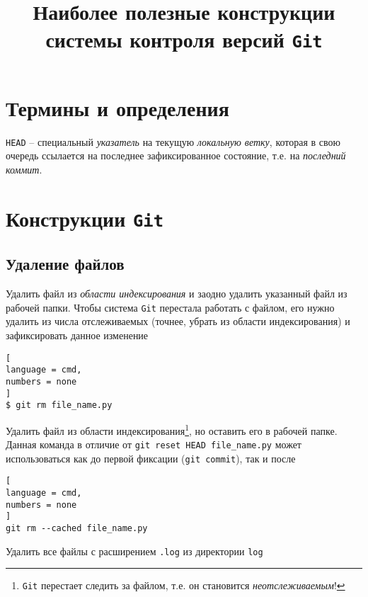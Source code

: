 \documentclass[%
	11pt,
	a4paper,
	utf8,
		]{article}
\begin{document}
\title{Наиболее полезные конструкции\\системы контроля версий  \texttt{Git}}

\author{}

\date{}
\maketitle

\thispagestyle{fancy}

\tableofcontents

\section{Термины и определения}

\noindent\texttt{HEAD} -- специальный \textit{указатель} на текущую \emph{локальную ветку}, которая в свою очередь ссылается на последнее зафиксированное состояние, т.е. на \emph{последний коммит}.


\section{Конструкции \texttt{Git}}

\subsection{Удаление файлов}

Удалить файл из \emph{области индексирования} и заодно удалить указанный файл из рабочей папки. Чтобы система \texttt{Git} перестала работать с файлом, его нужно удалить из числа отслеживаемых (точнее, убрать из области индексирования) и зафиксировать данное изменение 

\begin{lstlisting}[
language = cmd,
numbers = none
]
$ git rm file_name.py
\end{lstlisting}


Удалить файл из области индексирования\footnote{\texttt{Git} перестает следить за файлом, т.е. он становится \emph{неотслеживаемым}!}, но оставить его в рабочей папке. Данная команда в отличие от \texttt{git reset HEAD file\_name.py} может использоваться как до первой фиксации (\texttt{git commit}), так и после

\begin{lstlisting}[
language = cmd,
numbers = none
]
git rm --cached file_name.py
\end{lstlisting}


Удалить все файлы с расширением \texttt{.log} из директории \texttt{log}







\begin{thebibliography}{99}
	\bibitem{  }{  }
\end{thebibliography}

\end{document}
